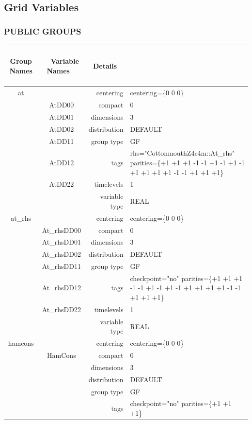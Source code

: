 \documentclass{article}
\begin{document}
\subsection*{Grid Variables}
\vspace{5mm}\subsubsection{PUBLIC GROUPS}

\vspace{5mm}

\begin{tabular*}{150mm}{|c|c@{\extracolsep{\fill}}|rl|} \hline 
~ {\bf Group Names} ~ & ~ {\bf Variable Names} ~  &{\bf Details} ~ & ~\\ 
\hline 
at &  & centering & centering=\{0 0 0\} \\ 
 & AtDD00 & compact & 0 \\ 
 & AtDD01 & dimensions & 3 \\ 
 & AtDD02 & distribution & DEFAULT \\ 
 & AtDD11 & group type & GF \\ 
 & AtDD12 & tags & rhs="CottonmouthZ4c4m::At\_rhs" parities=\{+1 +1 +1  -1 -1 +1  -1 +1 -1  +1 +1 +1  +1 -1 -1  +1 +1 +1\} \\ 
 & AtDD22 & timelevels & 1 \\ 
 &  & variable type & REAL \\ 
\hline 
at\_rhs &  & centering & centering=\{0 0 0\} \\ 
 & At\_rhsDD00 & compact & 0 \\ 
 & At\_rhsDD01 & dimensions & 3 \\ 
 & At\_rhsDD02 & distribution & DEFAULT \\ 
 & At\_rhsDD11 & group type & GF \\ 
 & At\_rhsDD12 & tags & checkpoint="no" parities=\{+1 +1 +1  -1 -1 +1  -1 +1 -1  +1 +1 +1  +1 -1 -1  +1 +1 +1\} \\ 
 & At\_rhsDD22 & timelevels & 1 \\ 
 &  & variable type & REAL \\ 
\hline 
hamcons &  & centering & centering=\{0 0 0\} \\ 
 & HamCons & compact & 0 \\ 
 &  & dimensions & 3 \\ 
 &  & distribution & DEFAULT \\ 
 &  & group type & GF \\ 
 &  & tags & checkpoint="no" parities=\{+1 +1 +1\} \\ 

\end{tabular*}
\end{document}
